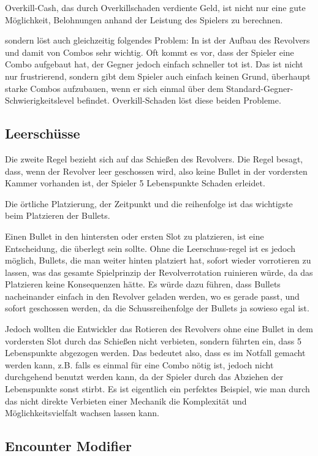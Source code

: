 Overkill-Cash, das durch Overkillschaden verdiente Geld, ist nicht nur eine gute Möglichkeit, Belohnungen anhand der Leistung des Spielers zu berechnen.


sondern löst auch gleichzeitig folgendes Problem: In \FF ist der Aufbau des Revolvers und damit von Combos sehr wichtig.
Oft kommt es vor, dass der Spieler eine Combo aufgebaut hat, der Gegner jedoch einfach schneller tot ist.
Das ist nicht nur frustrierend, sondern gibt dem Spieler auch einfach keinen Grund, überhaupt starke Combos aufzubauen,
wenn er sich einmal über dem Standard-Gegner-Schwierigkeitslevel befindet. Overkill-Schaden löst diese beiden Probleme.


\subsection{Leerschüsse}\label{leerschüsse}

Die zweite Regel bezieht sich auf das Schießen des Revolvers.
Die Regel besagt, dass, wenn der Revolver leer geschossen wird, also keine Bullet in der vordersten Kammer vorhanden ist,
der Spieler 5 Lebenspunkte Schaden erleidet.

Die örtliche Platzierung, der Zeitpunkt und die reihenfolge ist das wichtigste beim Platzieren der Bullets.

Einen Bullet in den hintersten oder ersten Slot zu platzieren, ist eine Entscheidung, die überlegt sein sollte.
Ohne die Leerschuss-regel ist es jedoch möglich, Bullets, die man weiter hinten platziert hat, sofort wieder vorrotieren zu lassen,
was das gesamte Spielprinzip der Revolverrotation ruinieren würde, da das Platzieren keine Konsequenzen hätte.
Es würde dazu führen, dass Bullets nacheinander einfach in den Revolver geladen werden, wo es gerade passt, und sofort
geschossen werden, da die Schussreihenfolge der Bullets ja sowieso egal ist.


Jedoch wollten die Entwickler das Rotieren des Revolvers ohne eine Bullet in dem vordersten Slot durch das Schießen nicht verbieten, sondern führten ein,
dass 5 Lebenspunkte abgezogen werden. Das bedeutet also, dass es im Notfall gemacht werden kann, z.B. falls es einmal für
eine Combo nötig ist, jedoch nicht durchgehend benutzt werden kann, da der Spieler durch das Abziehen der Lebenspunkte sonst stirbt.
Es ist eigentlich ein perfektes Beispiel, wie man durch das nicht direkte Verbieten einer Mechanik die Komplexität und
Möglichkeitsvielfalt wachsen lassen kann.


\subsection{Encounter Modifier}\label{encounter_modifier}


